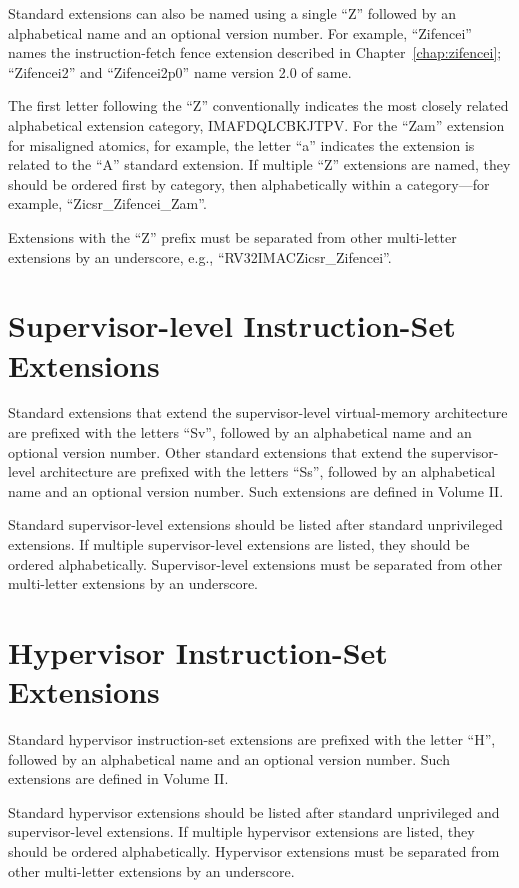 Standard extensions can also be named using a single ``Z'' followed by an
alphabetical name and an optional version number.  For example,
``Zifencei'' names the instruction-fetch fence extension described in
Chapter~\ref{chap:zifencei}; ``Zifencei2'' and ``Zifencei2p0'' name version
2.0 of same.

The first letter following the ``Z'' conventionally indicates the most closely
related alphabetical extension category, IMAFDQLCBKJTPV.  For the ``Zam''
extension for misaligned atomics, for example, the letter ``a'' indicates the
extension is related to the ``A'' standard extension.  If multiple ``Z''
extensions are named, they should be ordered first by category, then
alphabetically within a category---for example, ``Zicsr\_Zifencei\_Zam''.

Extensions with the ``Z'' prefix must be separated
from other multi-letter extensions by an underscore, e.g.,
``RV32IMACZicsr\_Zifencei''.

\section{Supervisor-level Instruction-Set Extensions}

Standard extensions that extend the supervisor-level virtual-memory
architecture are prefixed with the letters ``Sv'', followed by an alphabetical
name and an optional version number.  Other standard extensions that extend
the supervisor-level architecture are prefixed with the letters ``Ss'',
followed by an alphabetical name and an optional version number.  Such
extensions are defined in Volume II.

Standard supervisor-level extensions should be listed after standard
unprivileged extensions.  If multiple supervisor-level extensions are listed,
they should be ordered alphabetically.  Supervisor-level extensions must be
separated from other multi-letter extensions by an underscore.

\section{Hypervisor Instruction-Set Extensions}

Standard hypervisor instruction-set extensions are prefixed with the letter
``H'', followed by an alphabetical name and an optional version number.
Such extensions are defined in Volume II.

Standard hypervisor extensions should be listed after standard unprivileged
and supervisor-level extensions.  If multiple hypervisor extensions are
listed, they should be ordered alphabetically.  Hypervisor extensions
must be separated from other multi-letter extensions by an underscore.

